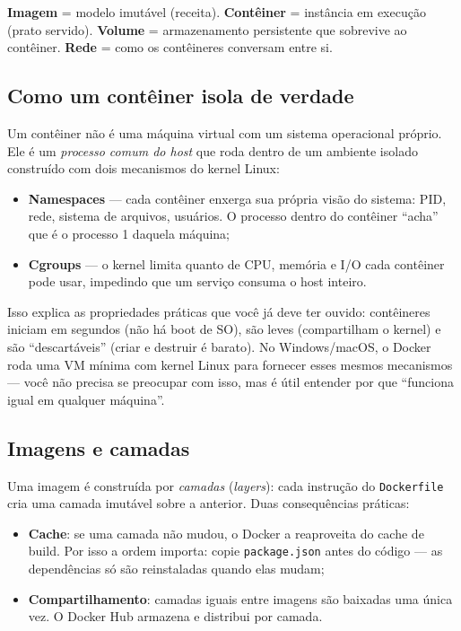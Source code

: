\begin{caixaconceito}
\textbf{Imagem} = modelo imutável (receita). \textbf{Contêiner} = instância em
execução (prato servido). \textbf{Volume} = armazenamento persistente que
sobrevive ao contêiner. \textbf{Rede} = como os contêineres conversam entre si.
\end{caixaconceito}

\subsection{Como um contêiner isola de verdade}

Um contêiner não é uma máquina virtual com um sistema operacional próprio. Ele
é um \emph{processo comum do host} que roda dentro de um ambiente isolado
construído com dois mecanismos do kernel Linux:

\begin{itemize}[leftmargin=*, itemsep=0.4em]
  \item \textbf{Namespaces} — cada contêiner enxerga sua própria visão do
  sistema: PID, rede, sistema de arquivos, usuários. O processo dentro do
  contêiner ``acha'' que é o processo 1 daquela máquina;
  \item \textbf{Cgroups} — o kernel limita quanto de CPU, memória e I/O cada
  contêiner pode usar, impedindo que um serviço consuma o host inteiro.
\end{itemize}

Isso explica as propriedades práticas que você já deve ter ouvido: contêineres
iniciam em segundos (não há boot de SO), são leves (compartilham o kernel) e
são ``descartáveis'' (criar e destruir é barato). No Windows/macOS, o Docker
roda uma VM mínima com kernel Linux para fornecer esses mesmos mecanismos —
você não precisa se preocupar com isso, mas é útil entender por que ``funciona
igual em qualquer máquina''.

\subsection{Imagens e camadas}

Uma imagem é construída por \emph{camadas} (\emph{layers}): cada instrução do
\texttt{Dockerfile} cria uma camada imutável sobre a anterior. Duas
consequências práticas:

\begin{itemize}[leftmargin=*, itemsep=0.4em]
  \item \textbf{Cache}: se uma camada não mudou, o Docker a reaproveita do
  cache de build. Por isso a ordem importa: copie \texttt{package.json} antes
  do código — as dependências só são reinstaladas quando elas mudam;
  \item \textbf{Compartilhamento}: camadas iguais entre imagens são baixadas
  uma única vez. O Docker Hub armazena e distribui por camada.
\end{itemize}

